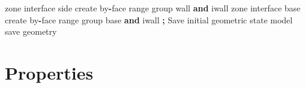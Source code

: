 \documentclass[a4paper, nobind]{templates/ociamthesis}
\newenvironment{Shaded}{\begin{snugshade}}{\end{snugshade}}
\newcommand{\BuiltInTok}[1]{#1}
\newcommand{\KeywordTok}[1]{\textcolor[rgb]{0.13,0.29,0.53}{\textbf{#1}}}
\newcommand{\NormalTok}[1]{#1}
\newcommand{\OperatorTok}[1]{\textcolor[rgb]{0.81,0.36,0.00}{\textbf{#1}}}
\newcommand{\StringTok}[1]{\textcolor[rgb]{0.31,0.60,0.02}{#1}}
\renewenvironment{Shaded}
{
  \vspace{10pt}%
  \begin{snugshade}%
}{%
  \end{snugshade}%
  \vspace{8pt}%
}
\begin{document}
\begin{Shaded}
\begin{Highlighting}[]
\NormalTok{zone interface }\StringTok{\textquotesingle{}side\textquotesingle{}}\NormalTok{ create by}\OperatorTok{{-}}\NormalTok{face }\BuiltInTok{range}\NormalTok{ group }\StringTok{\textquotesingle{}wall\textquotesingle{}} \KeywordTok{and} \StringTok{\textquotesingle{}iwall\textquotesingle{}}
\NormalTok{zone interface }\StringTok{\textquotesingle{}base\textquotesingle{}}\NormalTok{ create by}\OperatorTok{{-}}\NormalTok{face }\BuiltInTok{range}\NormalTok{ group }\StringTok{\textquotesingle{}base\textquotesingle{}} \KeywordTok{and} \StringTok{\textquotesingle{}iwall\textquotesingle{}}
\OperatorTok{;}\NormalTok{ Save initial geometric state}
\NormalTok{model save }\StringTok{\textquotesingle{}geometry\textquotesingle{}}
\end{Highlighting}
\end{Shaded}

\hypertarget{properties-1}{%
\section{Properties}\label{properties-1}}
\end{document}

